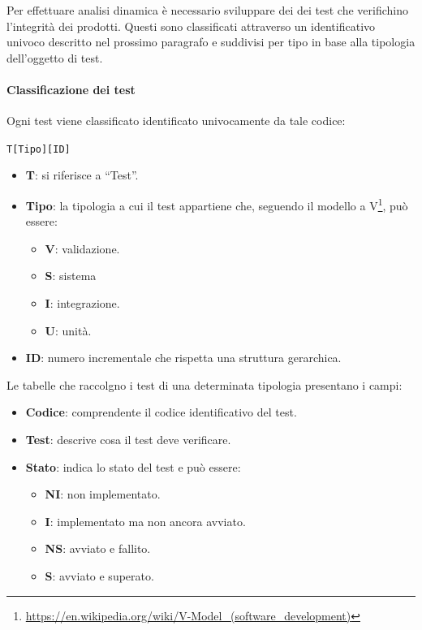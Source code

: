 		Per effettuare analisi dinamica è necessario sviluppare dei dei test che verifichino l'integrità dei prodotti. Questi sono classificati attraverso un identificativo univoco descritto nel prossimo paragrafo e suddivisi per tipo in base alla tipologia dell'oggetto di test.

			\paragraph{Classificazione dei test}\label{ClassificazioneTest}
			Ogni test viene classificato identificato univocamente da tale codice:

			\begin{center}
				\texttt{T[Tipo][ID]}
			\end{center}

			\begin{itemize}
				\item \textbf{T}: si riferisce a ``Test''.
				\item \textbf{Tipo}: la tipologia a cui il test appartiene che, seguendo il modello a V\footnote{\url{https://en.wikipedia.org/wiki/V-Model_(software_development)}}, può essere:
				\begin{itemize}
					\item \textbf{V}: validazione.
					\item \textbf{S}: sistema
					\item \textbf{I}: integrazione.
					\item \textbf{U}: unità.
				\end{itemize}
				\item \textbf{ID}: numero incrementale che rispetta una struttura gerarchica.
			\end{itemize}

			\newcommand{\TNI}{{\color{gray}\textbf{NI}}}
			\newcommand{\TI}{{\color{blue}\textbf{I}}}
			\newcommand{\TNS}{{\color{red}\textbf{NS}}}
			\newcommand{\TS}{{\color{green}\textbf{S}}}

			Le tabelle che raccolgno i test di una determinata tipologia presentano i campi:
			\begin{itemize}
				\item \textbf{Codice}: comprendente il codice identificativo del test.
				\item \textbf{Test}: descrive cosa il test deve verificare.
				\item \textbf{Stato}: indica lo stato del test e può essere:
				\begin{itemize}
					\item \TNI: non implementato.
					\item \TI: implementato ma non ancora avviato.
					\item \TNS: avviato e fallito.
					\item \TS: avviato e superato.
				\end{itemize}
			\end{itemize}

